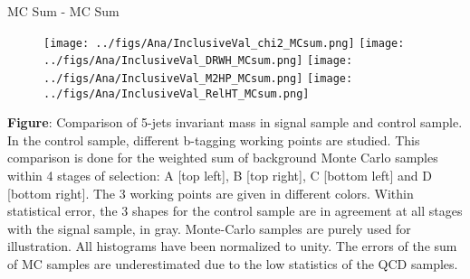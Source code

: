 \begin{frame}{MC Sum - MC Sum}
\vspace{-.2cm}
\begin{figure}[!Hhtbp]
  \begin{center}
    \texttt{[image: ../figs/Ana/InclusiveVal\_chi2\_MCsum.png]}
    \texttt{[image: ../figs/Ana/InclusiveVal\_DRWH\_MCsum.png]}
    \texttt{[image: ../figs/Ana/InclusiveVal\_M2HP\_MCsum.png]}
    \texttt{[image: ../figs/Ana/InclusiveVal\_RelHT\_MCsum.png]}
  \end{center}
\end{figure}

\vspace{-.2cm}
    \begin{block}{}\tiny
      \textbf{Figure}: Comparison of 5-jets invariant mass in signal sample and control sample. In the control sample, different b-tagging working points are studied. This comparison is done for the weighted sum of background Monte Carlo samples within 4 stages of selection: A [top left], B [top right], C [bottom left] and D [bottom right]. The 3 working points are given in different colors. Within statistical error, the 3 shapes for the control sample are in agreement at all stages with the signal sample, in gray. Monte-Carlo samples are purely used for illustration. All histograms have been normalized to unity. The errors of the sum of MC samples are underestimated due to the low statistics of the QCD samples.
    \end{block}

\end{frame}


